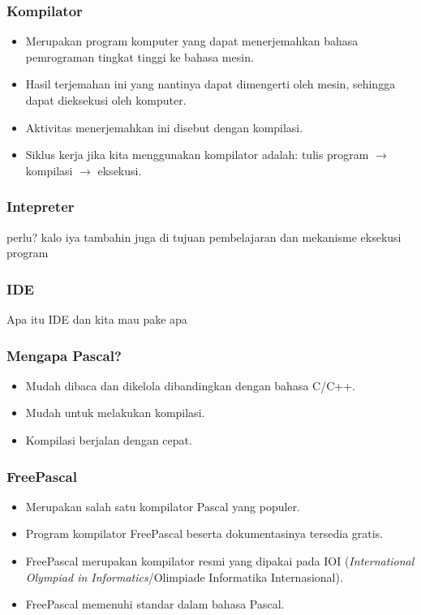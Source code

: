 \documentclass{beamer}
\begin{document}
\begin{frame}
\frametitle{Kompilator}
\begin{itemize}
	\item Merupakan program komputer yang dapat menerjemahkan bahasa pemrograman tingkat tinggi ke bahasa mesin.
	\item Hasil terjemahan ini yang nantinya dapat dimengerti oleh mesin, sehingga dapat dieksekusi oleh komputer.
	\item Aktivitas menerjemahkan ini disebut dengan kompilasi.
	\item Siklus kerja jika kita menggunakan kompilator adalah: tulis program $\rightarrow$ kompilasi $\rightarrow$ eksekusi.
\end{itemize}

\end{frame}

\begin{frame}
\frametitle{Intepreter}
perlu? kalo iya tambahin juga di tujuan pembelajaran dan mekanisme eksekusi program
\end{frame}

\begin{frame}
\frametitle{IDE}
Apa itu IDE dan kita mau pake apa
\end{frame}

\begin{frame}
\frametitle{Mengapa Pascal?}
\begin{itemize}
	\item Mudah dibaca dan dikelola dibandingkan dengan bahasa C/C++.
	\item Mudah untuk melakukan kompilasi.
	\item Kompilasi berjalan dengan cepat.
\end{itemize}
\end{frame}

\begin{frame}
\frametitle{FreePascal}
\begin{itemize}
	\item Merupakan salah satu kompilator Pascal yang populer.
	\item Program kompilator FreePascal beserta dokumentasinya tersedia gratis.
	\item FreePascal merupakan kompilator resmi yang dipakai pada IOI (\textit{International Olympiad in Informatics}/Olimpiade Informatika Internasional).
	\item FreePascal memenuhi standar dalam bahasa Pascal.
\end{itemize}
\end{frame}
\end{document}
